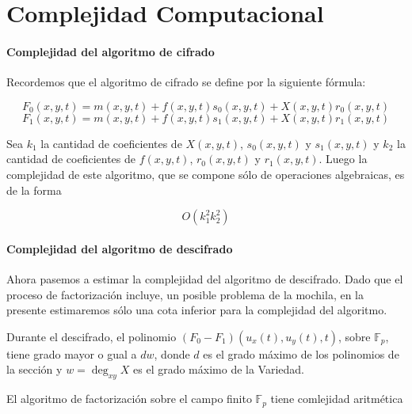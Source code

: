 \documentclass[12pt]{article}
\begin{document}


\section*{Complejidad Computacional}

\paragraph*{Complejidad del algoritmo de cifrado}


Recordemos que el algoritmo de cifrado se define por la siguiente f\'ormula:

$$F_0 (x, y, t) = m(x, y, t) + f (x, y, t)s_0 (x, y, t) + X(x, y, t)r_0 (x, y, t)$$
$$F_1 (x, y, t) = m(x, y, t) + f (x, y, t)s_1 (x, y, t) + X(x, y, t)r_1 (x, y, t)$$

Sea $k_1$ la cantidad de coeficientes de $X(x,y,t)$, $s_0(x,y,t)$ y  $s_1(x,y,t)$ y $k_2$ la cantidad de coeficientes de $f(x,y,t)$, $r_0(x,y,t)$  y $r_1(x,y,t)$. Luego la complejidad de este algoritmo, que se compone s\'olo de operaciones algebraicas, es de la forma

$$O(k_1^2 k_2^2)$$



\paragraph*{Complejidad del algoritmo de descifrado}


Ahora pasemos a estimar la complejidad del algoritmo de descifrado. Dado que el proceso de factorización incluye, un posible problema de la mochila, en la presente estimaremos sólo una cota inferior para la complejidad del algoritmo. 


Durante el descifrado, el polinomio $(F_0 - F_1)(u_x(t),u_y(t),t)$, sobre
$\mathbb{F}_p$, tiene grado mayor o gual a $dw$, donde $d$ es el grado m\'aximo de los polinomios de la secci\'on y $w= \deg_{xy} X$ es el grado m\'aximo de la Variedad.  

El algoritmo de factorizaci\'on sobre el campo finito $\mathbb{F}_p$ tiene comlejidad aritm\'etica 
\end{document}
